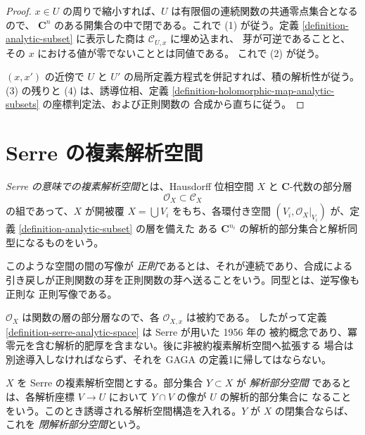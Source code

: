 \begin{proof}
$x\in U$ の周りで縮小すれば、$U$ は有限個の連続関数の共通零点集合となるので、
$\mathbf C^n$ のある開集合の中で閉である。これで (1) が従う。定義
\ref{definition-analytic-subset} に表示した商は $\mathcal C_{U,x}$ に埋め込まれ、
芽が可逆であることと、その $x$ における値が零でないこととは同値である。
これで (2) が従う。

$(x,x')$ の近傍で $U$ と $U'$ の局所定義方程式を併記すれば、積の解析性が従う。
(3) の残りと (4) は、誘導位相、定義
\ref{definition-holomorphic-map-analytic-subsets} の座標判定法、および正則関数の
合成から直ちに従う。
\end{proof}


\section{Serre の複素解析空間}
\label{section-serre-analytic-spaces}

\begin{definition}
\label{definition-serre-analytic-space}
\begin{reference}
\cite[\S 1、第2項、4--5頁]{GAGA}
\end{reference}
{\it Serre の意味での複素解析空間}とは、Hausdorff 位相空間 $X$ と
$\mathbf C$-代数の部分層
$$
\mathcal O_X \subset \mathcal C_X
$$
の組であって、$X$ が開被覆 $X=\bigcup V_i$ をもち、各環付き空間
$(V_i,\mathcal O_X|_{V_i})$ が、定義 \ref{definition-analytic-subset} の層を備えた
ある $\mathbf C^{n_i}$ の解析的部分集合と解析同型になるものをいう。

このような空間の間の写像が {\it 正則}であるとは、それが連続であり、合成による
引き戻しが正則関数の芽を正則関数の芽へ送ることをいう。同型とは、逆写像も正則な
正則写像である。
\end{definition}

\begin{remark}[被約の場合に限ること]
\label{remark-serre-analytic-spaces-reduced}
$\mathcal O_X$ は関数の層の部分層なので、各 $\mathcal O_{X,x}$ は被約である。
したがって定義 \ref{definition-serre-analytic-space} は Serre が用いた 1956 年の
被約概念であり、冪零元を含む解析的肥厚を含まない。後に非被約複素解析空間へ拡張する
場合は別途導入しなければならず、それを GAGA の定義1に帰してはならない。
\end{remark}

\begin{definition}
\label{definition-analytic-subspace}
$X$ を Serre の複素解析空間とする。部分集合 $Y\subset X$ が {\it 解析部分空間}
であるとは、各解析座標 $V\to U$ において $Y\cap V$ の像が $U$ の解析的部分集合に
なることをいう。このとき誘導される解析空間構造を入れる。$Y$ が $X$ の閉集合ならば、
これを {\it 閉解析部分空間}という。
\end{definition}

